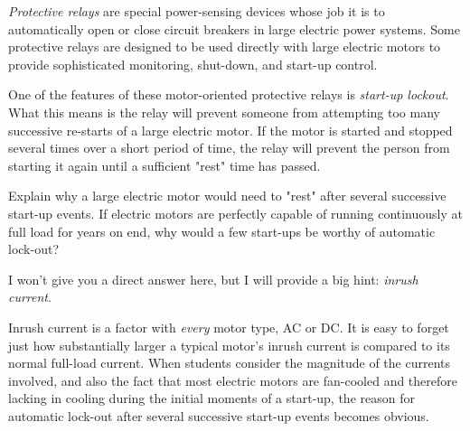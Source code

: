

{\it Protective relays} are special power-sensing devices whose job it is to automatically open or close circuit breakers in large electric power systems.  Some protective relays are designed to be used directly with large electric motors to provide sophisticated monitoring, shut-down, and start-up control.

One of the features of these motor-oriented protective relays is {\it start-up lockout}.  What this means is the relay will prevent someone from attempting too many successive re-starts of a large electric motor.  If the motor is started and stopped several times over a short period of time, the relay will prevent the person from starting it again until a sufficient "rest" time has passed.

Explain why a large electric motor would need to "rest" after several successive start-up events.  If electric motors are perfectly capable of running continuously at full load for years on end, why would a few start-ups be worthy of automatic lock-out?







I won't give you a direct answer here, but I will provide a big hint: {\it inrush current}.







Inrush current is a factor with {\it every} motor type, AC or DC.  It is easy to forget just how substantially larger a typical motor's inrush current is compared to its normal full-load current.  When students consider the magnitude of the currents involved, and also the fact that most electric motors are fan-cooled and therefore lacking in cooling during the initial moments of a start-up, the reason for automatic lock-out after several successive start-up events becomes obvious.




